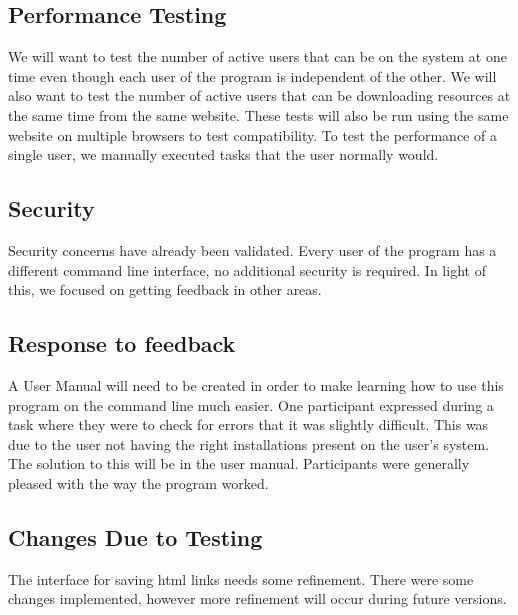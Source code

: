\documentclass[12pt, titlepage]{article}
\begin{document}
\subsection{Performance Testing}
We will want to test the number of active users that can be on the system at one time even though each user of the program is independent of the other. We will also want to test the number of active users that can be downloading resources at the same time from the same website. These tests will also be run using the same website on multiple browsers to test compatibility.  To test the performance of a single user, we manually executed tasks that the user normally would.

\subsection{Security}
Security concerns have already been validated. Every user of the program has a different command line interface, no additional security is required. In light of this, we focused on getting feedback in other areas.

\subsection{Response to feedback}
A User Manual will need to be created in order to make learning how to use this program on the command line much easier.
One participant expressed during a task where they were to check for errors that it was slightly difficult. This was due to the user not having the right installations present on the user's system. The solution to this will be in the user manual. Participants were generally pleased with the way the program worked. 

\subsection{Changes Due to Testing}
The interface for saving html links needs some refinement. There were some changes implemented, however more refinement will occur during future versions.
\end{document}
